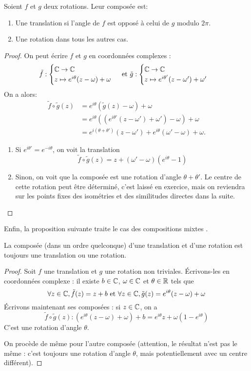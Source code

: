 \begin{proposition}
Soient $f$ et $g$ deux rotations. Leur composée est:
\begin{enumerate}
\item Une translation si l'angle de $f$ est opposé à celui de $g$ modulo $2\pi$.
\item Une rotation dans tous les autres cas.
\end{enumerate}
\end{proposition}
\begin{proof}
On peut écrire $f$ et $g$ en coordonnées complexes : 
\[ \tilde f : \begin{cases}\mathbb{C}\to\mathbb{C}\\z\mapsto e^{i\theta}(z-\omega)+\omega\end{cases}
\text{ et }
\tilde g : \begin{cases}\mathbb{C}\to\mathbb{C}\\z\mapsto e^{i\theta'}(z-\omega')+\omega'\end{cases}
\]
On a alors:
\begin{align*}
\tilde f\circ \tilde g(z)
&= e^{i\theta}(\tilde g(z)-\omega)+\omega\\
&= e^{i\theta}((e^{i\theta'}(z-\omega')+\omega')-\omega)+\omega\\
&= e^{i(\theta+\theta')}(z-\omega')+e^{i\theta}(\omega'-\omega)+\omega.
\end{align*}
\begin{enumerate}
\item Si $e^{i\theta'}=e^{-i\theta}$, on voit la translation 
\[
\tilde f\circ \tilde g(z)=z+(\omega'-\omega)(e^{i\theta}-1)
\]
\item Sinon, on voit que la composée est une rotation d'angle $\theta+\theta'$. Le centre de cette rotation peut être déterminé, c'est laissé en exercice, mais on reviendra sur les points fixes des isométries et des similitudes directes dans la suite.
\end{enumerate}
\end{proof}

Enfin, la proposition suivante traite le cas des compositions \og mixtes \fg{}.

\begin{proposition}
La composée (dans un ordre quelconque) d'une translation et d'une rotation est toujours une translation ou une rotation.
\end{proposition}
\begin{proof}
Soit $f$ une translation et $g$ une rotation non triviales. Écrivons-les en coordonnées complexe : il existe $b\in\mathbb{C}$, $\omega\in\mathbb{C}$ et $\theta \in\mathbb{R}$ tels que
\[ \forall z\in\mathbb{C}, \tilde f(z)=z+b \text{ et } \forall z\in\mathbb{C}, \tilde g(z)=e^{i\theta}(z-\omega)+\omega\]
Écrivons maintenant ses composées : si $z\in\mathbb{C}$, on a 
\[ \tilde f\circ \tilde g(z) : (e^{i\theta}(z-\omega)+\omega)+b=e^{i\theta}z+\omega(1-e^{i\theta})\]
C'est une rotation d'angle $\theta$.

On procède de même pour l'autre composée (attention, le résultat n'est pas le même : c'est toujours une rotation d'angle $\theta$, mais potentiellement avec un centre différent).
\end{proof}


